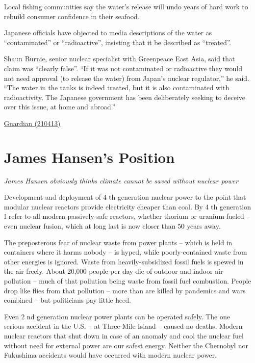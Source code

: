 \documentclass[
]{book}
\begin{document}
Local fishing communities say the water's release will undo years of hard work to rebuild consumer confidence in their seafood.

Japanese officials have objected to media descriptions of the water as ``contaminated'' or ``radioactive'', insisting that it be described as ``treated''.

Shaun Burnie, senior nuclear specialist with Greenpeace East Asia, said that claim was ``clearly false''.
``If it was not contaminated or radioactive they would not need approval (to release the water) from Japan's nuclear regulator,'' he said. ``The water in the tanks is indeed treated, but it is also contaminated with radioactivity. The Japanese government has been deliberately seeking to deceive over this issue, at home and abroad.''

\href{https://www.theguardian.com/environment/2021/apr/13/fukushima-japan-to-start-dumping-contaminated-water-pacific-ocean}{Guardian (210413)}

\hypertarget{james-hansens-position}{%
\section{James Hansen's Position}\label{james-hansens-position}}

\emph{James Hansen obviously thinks climate cannot be saved without nuclear power}

Development and deployment of 4 th generation nuclear power to
the point that modular nuclear reactors provide electricity cheaper than coal. By 4 th generation I
refer to all modern passively-safe reactors, whether thorium or uranium fueled -- even nuclear
fusion, which at long last is now closer than 50 years away.

The preposterous fear of nuclear waste from power plants --
which is held in containers where it harms nobody -- is hyped, while poorly-contained waste
from other energies is ignored. Waste from heavily-subsidized fossil fuels is spewed in the air
freely. About 20,000 people per day die of outdoor and indoor air pollution -- much of that
pollution being waste from fossil fuel combustion. People drop like flies from that pollution --
more than are killed by pandemics and wars combined -- but politicians pay little heed.

Even 2 nd generation nuclear power
plants can be operated safely. The one serious accident in the U.S. -- at Three-Mile Island --
caused no deaths. Modern nuclear reactors that shut down in case of an anomaly and cool the
nuclear fuel without need for external power are our safest energy. Neither the Chernobyl nor
Fukushima accidents would have occurred with modern nuclear power.
\end{document}
